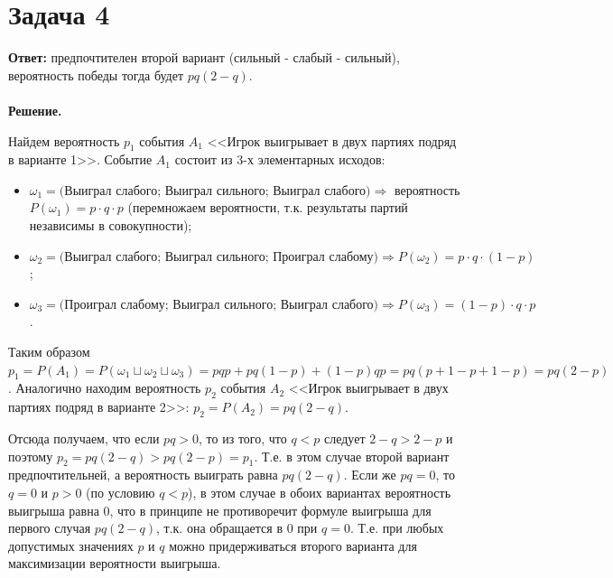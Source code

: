 \documentclass{article}
\begin{document}
\section*{Задача 4}
{\bf Ответ: } предпочтителен второй вариант (сильный - слабый - сильный), вероятность победы тогда будет $pq(2-q)$.
\\
\\
{\bf Решение.} 
\par
Найдем вероятность $p_1$ события $A_1$ <<Игрок выигрывает в двух партиях подряд в варианте 1>>. Событие $A_1$ состоит из 3-х элементарных исходов:
\begin{itemize}
    \item $\omega_1=\text{(Выиграл слабого; Выиграл сильного; Выиграл слабого)}\Rightarrow$ вероятность $P(\omega_1)=p\cdot q\cdot p$ (перемножаем вероятности, т.к. результаты партий независимы в совокупности);
    \item $\omega_2=\text{(Выиграл слабого; Выиграл сильного; Проиграл слабому)}\Rightarrow P(\omega_2) = p\cdot q \cdot (1 - p)$;
    \item $\omega_3=\text{(Проиграл слабому; Выиграл сильного; Выиграл слабого)}\Rightarrow P(\omega_3)=(1-p) \cdot q \cdot p$.
\end{itemize}
\par
Таким образом $p_1=P(A_1)=P(\omega_1\sqcup\omega_2\sqcup\omega_3)=pqp+pq(1-p)+(1-p)qp=pq(p+1-p+1-p)=pq(2-p)$. Аналогично находим вероятность $p_2$ события $A_2$ <<Игрок выигрывает в двух партиях подряд в варианте 2>>: $p_2=P(A_2)=pq(2-q)$.
\par
Отсюда получаем, что если $pq>0$, то из того, что $q < p$ следует $2 - q > 2 - p$ и поэтому $p_2=pq(2-q) > pq(2-p)=p_1$. Т.е. в этом случае второй вариант предпочтительней, а вероятность выиграть равна $pq(2-q)$. Если же $pq=0$, то $q=0$ и $p>0$ (по условию $q < p$), в этом случае в обоих вариантах вероятность выигрыша равна 0, что в принципе не противоречит формуле выигрыша для первого случая $pq(2-q)$, т.к. она обращается в 0 при $q=0$. Т.е. при любых допустимых значениях $p$ и $q$ можно придерживаться второго варианта для максимизации вероятности выигрыша.
\end{document}
